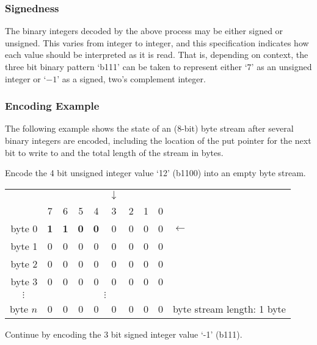 \documentclass[11pt,letterpaper]{article}
\begin{document}
\subsubsection{Signedness}

The binary integers decoded by the above process may be either signed or
 unsigned.
This varies from integer to integer, and this specification
 indicates how each value should be interpreted as it is read.
That is, depending on context, the three bit binary pattern `b111' can be taken
 to represent either `$7$' as an unsigned integer or `$-1$' as a signed, two's
 complement integer.

\subsubsection{Encoding Example}

The following example shows the state of an (8-bit) byte stream after several
 binary integers are encoded, including the location of the put pointer for the
 next bit to write to and the total length of the stream in bytes.

Encode the 4 bit unsigned integer value `12' (b1100) into an empty byte stream.

\begin{tabular}{r|ccccccccl}
\multicolumn{1}{r}{}& &&&&$\downarrow$&&&& \\
         & 7 & 6 & 5 & 4 & 3 & 2 & 1 & 0 & \\\cline{1-9}
byte 0   & \textbf{1} & \textbf{1} & \textbf{0} & \textbf{0} &
                           0 & 0 & 0 & 0 & $\leftarrow$     \\
byte 1   & 0 & 0 & 0 & 0 & 0 & 0 & 0 & 0 &                  \\
byte 2   & 0 & 0 & 0 & 0 & 0 & 0 & 0 & 0 &                  \\
byte 3   & 0 & 0 & 0 & 0 & 0 & 0 & 0 & 0 &                  \\
\multicolumn{1}{c|}{$\vdots$}&\multicolumn{8}{c}{$\vdots$}& \\
byte $n$ & 0 & 0 & 0 & 0 & 0 & 0 & 0 & 0 &
byte stream length: 1 byte
\end{tabular}
\vspace{\baselineskip}

Continue by encoding the 3 bit signed integer value `-1' (b111).
\end{document}
